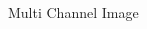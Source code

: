 \documentclass{standalone}
\begin{document}
\begin{frame}{Multi Channel Image}
\begin{columns}
\begin{column}{.3\textwidth}
						
					
						
					
					
			\end{column}		
		\end{columns}
		
	\end{frame}
\end{document}
